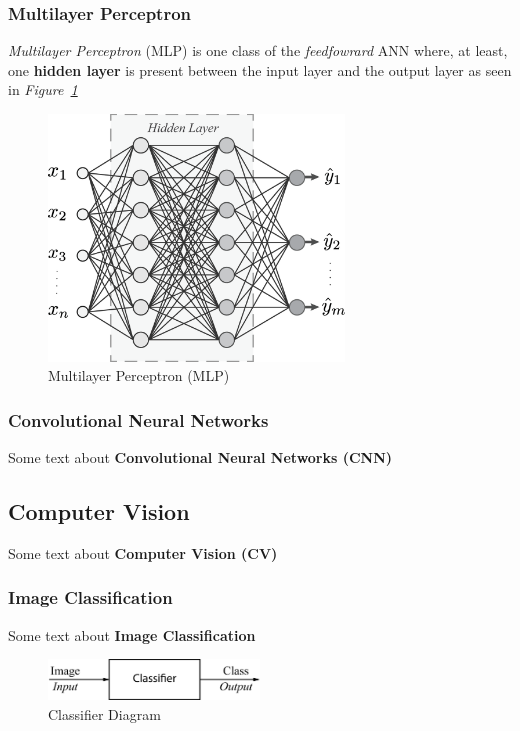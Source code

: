 \documentclass[12pt]{extarticle}
\begin{document}
	\subsubsection{Multilayer Perceptron}\label{MLP}
	\emph{Multilayer Perceptron} (MLP) is one class of the \emph{feedfowrard} ANN where, at least, one \textbf{hidden layer} is present between the input layer and the output layer as seen in \emph{Figure~\ref{fig:MLP}}
	\begin{figure}[h]
		\centering
		\includegraphics[width=0.7\textwidth]{pics/Figures/MLP.eps}
		\caption{\small{Multilayer Perceptron (MLP)}}
		\label{fig:MLP}
	\end{figure}
	
	
	\subsubsection{Convolutional Neural Networks}\label{CNN}	
	Some text about \textbf{Convolutional Neural Networks (CNN)}
	\subsection{Computer Vision}\label{CV}
	Some text about \textbf{Computer Vision (CV)}
	\subsubsection{Image Classification}\label{Classification}
	Some text about \textbf{Image Classification}
	\begin{figure}[h]
		\centering
		\includegraphics[width=0.5\textwidth]{pics/Figures/Classifier_Block_Diagram.eps}
		\caption{\small{Classifier Diagram}}
		\label{fig:Classifier}
	\end{figure}
\end{document}
